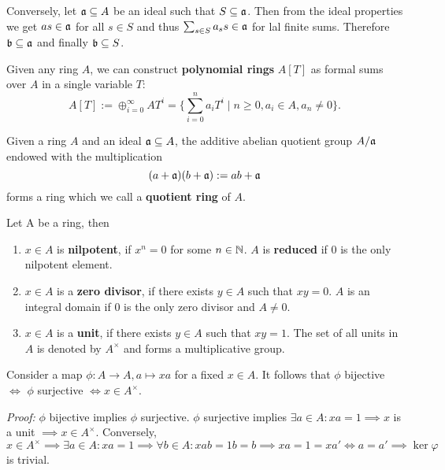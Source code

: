 Conversely, let $\mathfrak{a} \subseteq A$ be an ideal such that $S\subseteq \mathfrak{a}$. Then from the ideal properties we get $as \in \mathfrak{a}$ for all $s \in S$ and thus $\sum_{s\in S} a_s s \in \mathfrak{a}$ for lal finite sums. Therefore $\mathfrak{b} \subseteq \mathfrak{a}$ and finally $\mathfrak{b} \subseteq S$.

\begin{definition}
    Given any ring $A$, we can construct \textbf{polynomial rings} $A[T]$ as formal sums over $A$ in a single variable $T$:
    $$A[T]:=\oplus_{i=0}^\infty A T^i = \{ \sum_{i=0}^n a_i T^i \mid n\geq 0, a_i \in A, a_n \neq 0\}.$$
\end{definition}

\begin{definition}
    Given a ring $A$ and an ideal $\mathfrak{a} \subseteq A$, the additive abelian quotient group $A/\mathfrak{a}$ endowed with the multiplication 
    $$(a+\mathfrak{a})(b+\mathfrak{a}):=ab+\mathfrak{a}$$
    forms a ring which we call a \textbf{quotient ring} of $A$.
\end{definition}

\begin{definition}
    Let A be a ring, then
    \begin{enumerate}
        \item $x\in A$ is \textbf{nilpotent}, if $x^n = 0$ for some $n\in \mathbb{N}$. $A$ is \textbf{reduced} if $0$ is the only nilpotent element.
        \item $x\in A$ is a \textbf{zero divisor}, if there exists $y\in A$ such that $xy= 0$. $A$ is an integral domain if $0$ is the only zero divisor and $A\neq 0$.
        \item $x\in A$ is a \textbf{unit}, if there exists $y\in A$ such that $xy=1$. The set of all units in $A$ is denoted by $A^\times$ and forms a multiplicative group.
    \end{enumerate}
\end{definition}


\begin{lemma}
    Consider a map $\phi: A \rightarrow A, a \mapsto xa$ for a fixed $x\in A$.
    It follows that
    $\phi$ bijective $\iff$ $\phi$ surjective $\iff x\in A^\times$.
\end{lemma}
\textit{Proof:} $\phi$ bijective implies $\phi$ surjective. $\phi$ surjective implies $\exists a\in A : xa = 1 \implies x$ is a unit $\implies x\in A^\times$. Conversely, $x\in A^\times \implies \exists a \in A : xa = 1 \implies \forall b \in A : xab = 1b = b \implies xa = 1 = xa' \iff a=a' \implies \ker \varphi$ is trivial. 

